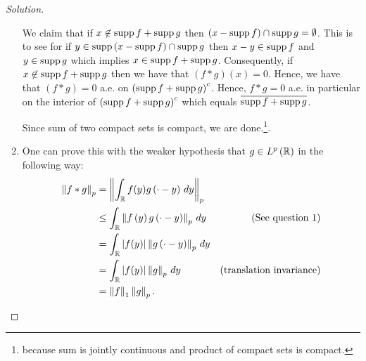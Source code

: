 \begin{proof}[Solution]
\begin{enumerate}[label=(\alph*)]
We claim that if $x \not \in \operatorname{supp} f + \operatorname{supp} g$ then $\left( x - \operatorname{supp} f \right) \cap \operatorname{supp} g = \emptyset$. This is to see for if $y \in \operatorname{supp} \left( x - \operatorname{supp} f \right) \cap \operatorname{supp} g$ then $x-y \in \operatorname{supp} f$ and $y \in \operatorname{supp} g$ which implies $x \in \operatorname{supp} f + \operatorname{supp} g$. 
Consequently, if $x \not \in \operatorname{supp} f + \operatorname{supp} g$ then we have that $\left( f * g \right)(x) = 0$. Hence, we have that $(f * g) = 0$ a.e. on $\left( \operatorname{supp} f + \operatorname{supp} g \right)^{c}$. Hence, $f * g = 0$ a.e. in particular on the interior of $\left( \operatorname{supp} f + \operatorname{supp} g \right)^{c}$ which equals $\overline{\operatorname{supp} f + \operatorname{supp} g}$.

Since sum of two compact sets is compact, we are done.\footnote{because sum is jointly continuous and product of compact sets is compact.}.
\item One can prove this with the weaker hypothesis that $g \in L^{p} \left( \mathbb R \right)$ in the following way:
\begin{align*}
\left\lVert f * g \right\rVert_{p} &= \left\lVert \int_{\mathbb R} f(y) g\left( \cdot - y \right) \, dy \right\rVert_{p} \\
&\le \int_{\mathbb R} \left\lVert f\left( y \right) g\left( \cdot - y \right) \right\rVert_{p} \, dy & \text{(See question 1)} \\
&= \int_{\mathbb R} \left\lvert f(y) \right\rvert \left\lVert g\left( \cdot - y \right) \right\rVert_{p} \, dy \\
&= \int_{\mathbb R} \left\lvert f(y) \right\rvert \left\lVert g \right\rVert_{p} \, dy & \text{(translation invariance)} \\
&= \left\lVert f \right\rVert_{1} \left\lVert g \right\rVert_{p}.
\end{align*}
\end{enumerate}

\end{proof}
